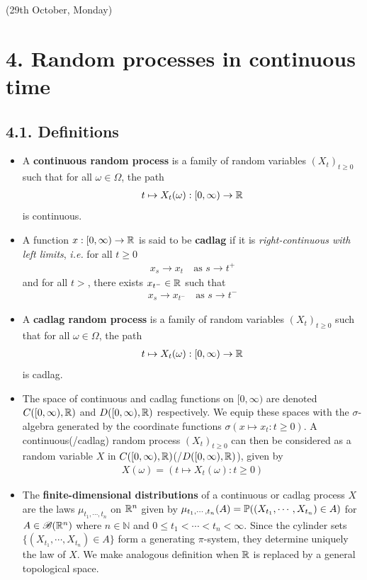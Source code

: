 \documentclass[10pt,a4paper]{report}
\begin{document}
\newday

(29th October, Monday)

\section*{4. Random processes in continuous time}

\subsection*{4.1. Definitions}

\begin{itemize}
\item A \textbf{continuous random process} is a family of random variables $(X_t)_{t\geq 0}$ such that for all $\omega \in \Omega$, the path
\begin{align*}
t \mapsto X_t(\omega) : [0, \infty ) \rightarrow \mathbb{R}
\end{align*}
is continuous.
\item A function $x:[0, \infty) \rightarrow \mathbb{R}$ is said to be \textbf{cadlag} if it is \emph{right-continuous with left limits}, \emph{i.e.} for all $t\geq 0$
\begin{align*}
x_s \rightarrow x_t \quad \text{as } s\rightarrow t^+
\end{align*}
and for all $t>$, there exists $x_{t^-} \in \mathbb{R}$ such that
\begin{align*}
x_s \rightarrow x_{t^-} \quad \text{as } s\rightarrow t^-
\end{align*}
\item A \textbf{cadlag random process} is a family of random variables $(X_t)_{t\geq 0}$ such that for all $\omega \in \Omega$, the path
\begin{align*}
t \mapsto X_t(\omega) : [0, \infty ) \rightarrow \mathbb{R}
\end{align*}
is cadlag.
\item The space of continuous and cadlag functions on $[0,\infty)$ are denoted $C([0,\infty),\mathbb{R})$ and $D([0,\infty), \mathbb{R})$ respectively. We equip these spaces with the $\sigma$-algebra generated by the coordinate functions $\sigma (x\mapsto x_t : t\geq 0)$. A continuous(/cadlag) random process $(X_t)_{t\geq 0}$ can then be considered as a random variable $X$ in $C([0,\infty), \mathbb{R})$(/$D([0,\infty), \mathbb{R})$), given by
\begin{align*}
X(\omega) = (t\mapsto X_t(\omega) : t\geq 0)
\end{align*}
\item The \textbf{finite-dimensional distributions} of a continuous or cadlag process $X$ are the laws $\mu_{t_1, \cdots ,t_n}$ on $\mathbb{R}^n$ given by $\mu_{t_1,\cdots, t_n}(A) = \mathbb{P}((X_{t_1},\cdots, X_{t_n}) \in A)$ for $A \in \mathscr{B}(\mathbb{R}^n)$ where $n \in \mathbb{N}$ and $0\leq t_1 <\cdots < t_n < \infty$. Since the cylinder sets $\{(X_{t_1}, \cdots, X_{t_n}) \in A\}$ form a generating $\pi$-system, they determine uniquely the law of $X$. We make analogous definition when $\mathbb{R}$ is replaced by a general topological space.
\end{itemize}
\end{document}
